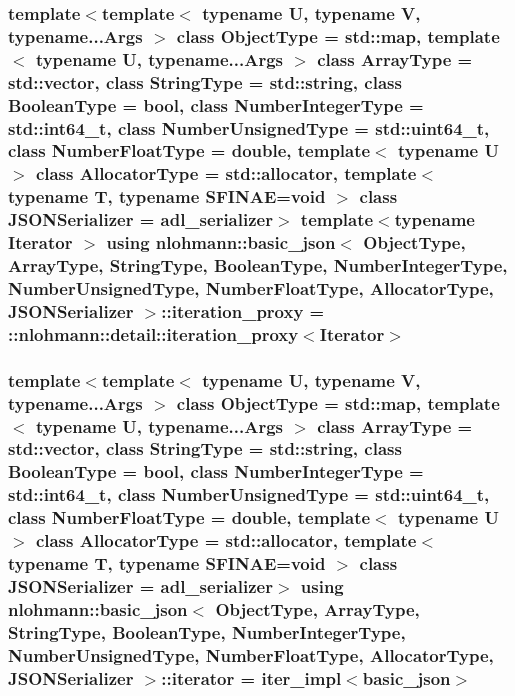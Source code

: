 \subsubsection[{\texorpdfstring{iteration\+\_\+proxy}{iteration_proxy}}]{\setlength{\rightskip}{0pt plus 5cm}template$<$template$<$ typename U, typename V, typename...\+Args $>$ class Object\+Type = std\+::map, template$<$ typename U, typename...\+Args $>$ class Array\+Type = std\+::vector, class String\+Type  = std\+::string, class Boolean\+Type  = bool, class Number\+Integer\+Type  = std\+::int64\+\_\+t, class Number\+Unsigned\+Type  = std\+::uint64\+\_\+t, class Number\+Float\+Type  = double, template$<$ typename U $>$ class Allocator\+Type = std\+::allocator, template$<$ typename T, typename S\+F\+I\+N\+A\+E=void $>$ class J\+S\+O\+N\+Serializer = adl\+\_\+serializer$>$ template$<$typename Iterator $>$ using {\bf nlohmann\+::basic\+\_\+json}$<$ Object\+Type, Array\+Type, String\+Type, Boolean\+Type, Number\+Integer\+Type, Number\+Unsigned\+Type, Number\+Float\+Type, Allocator\+Type, J\+S\+O\+N\+Serializer $>$\+::{\bf iteration\+\_\+proxy} =  \+::{\bf nlohmann\+::detail\+::iteration\+\_\+proxy}$<$Iterator$>$\hspace{0.3cm}{\ttfamily [private]}}\hypertarget{classnlohmann_1_1basic__json_afb49d897bc58d6678f4471925bbfbb01}{}\label{classnlohmann_1_1basic__json_afb49d897bc58d6678f4471925bbfbb01}
\subsubsection[{\texorpdfstring{iterator}{iterator}}]{\setlength{\rightskip}{0pt plus 5cm}template$<$template$<$ typename U, typename V, typename...\+Args $>$ class Object\+Type = std\+::map, template$<$ typename U, typename...\+Args $>$ class Array\+Type = std\+::vector, class String\+Type  = std\+::string, class Boolean\+Type  = bool, class Number\+Integer\+Type  = std\+::int64\+\_\+t, class Number\+Unsigned\+Type  = std\+::uint64\+\_\+t, class Number\+Float\+Type  = double, template$<$ typename U $>$ class Allocator\+Type = std\+::allocator, template$<$ typename T, typename S\+F\+I\+N\+A\+E=void $>$ class J\+S\+O\+N\+Serializer = adl\+\_\+serializer$>$ using {\bf nlohmann\+::basic\+\_\+json}$<$ Object\+Type, Array\+Type, String\+Type, Boolean\+Type, Number\+Integer\+Type, Number\+Unsigned\+Type, Number\+Float\+Type, Allocator\+Type, J\+S\+O\+N\+Serializer $>$\+::{\bf iterator} =  {\bf iter\+\_\+impl}$<${\bf basic\+\_\+json}$>$}\hypertarget{classnlohmann_1_1basic__json_a099316232c76c034030a38faa6e34dca}{}\label{classnlohmann_1_1basic__json_a099316232c76c034030a38faa6e34dca}


